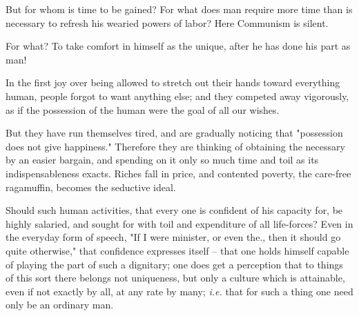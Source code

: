 But for whom is time to be gained? For what does man require more time than is 
necessary to refresh his wearied powers of labor? Here Communism is silent.

For what? To take comfort in himself as the unique, after he has done his part 
as man!

In the first joy over being allowed to stretch out their hands toward 
everything human, people forgot to want anything else; and they competed away 
vigorously, as if the possession of the human were the goal of all our wishes.

But they have run themselves tired, and are gradually noticing that 
"{}possession does not give happiness."{} Therefore they are thinking of 
obtaining the necessary by an easier bargain, and spending on it only so much 
time and toil as its indispensableness exacts. Riches fall in price, and 
contented poverty, the care-free ragamuffin, becomes the seductive ideal.

Should such human activities, that every one is confident of his capacity for, 
be highly salaried, and sought for with toil and expenditure of all 
life-forces? Even in the everyday form of speech, "{}If I were minister, or 
even the., then it should go quite otherwise,"{} that confidence expresses 
itself -- that one holds himself capable of playing the part of such a 
dignitary; one does get a perception that to things of this sort there belongs 
not uniqueness, but only a culture which is attainable, even if not exactly by 
all, at any rate by many; \textit{i.e.} that for such a thing one need only be 
an ordinary man.

